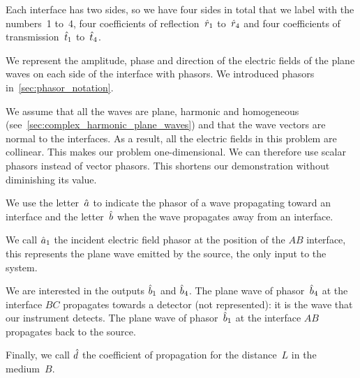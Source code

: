 Each interface has two sides, so we have four sides in total that we label with the numbers~1 to~4,
four coefficients of reflection~$\hat{r}_1$ to~$\hat{r}_4$ and
four coefficients of transmission~$\hat{t}_1$ to~$\hat{t}_4$.

We represent the amplitude, phase and direction of the electric fields of the plane waves on each side of the interface with phasors.
We introduced phasors in~\cref{sec:phasor_notation}.

We assume that all the waves are plane, harmonic and homogeneous
(see~\cref{sec:complex_harmonic_plane_waves})
and that the wave vectors are normal to the interfaces.
As a result, all the electric fields in this problem are collinear.
This makes our problem one-dimensional.
We can therefore use scalar phasors instead of vector phasors.
This shortens our demonstration without diminishing its value.

We use the letter~$\hat{a}$ to indicate the phasor of a wave propagating toward an interface and the letter~$\hat{b}$ when the wave propagates away from an interface.

We call $\hat{a}_1$ the incident electric field phasor at the position of the $AB$ interface,
this represents the plane wave emitted by the source, the only input to the system.

We are interested in the outputs $\hat{b}_1$ and $\hat{b}_4$.
The plane wave of phasor~$\hat{b}_4$ at the interface $BC$ propagates towards a detector (not represented): it is the wave that our instrument detects.
The plane wave of phasor~$\hat{b}_1$ at the interface $AB$ propagates back to the source.

Finally, we call $\hat{d}$ the coefficient of propagation for the distance~$L$ in the medium~$B$.

